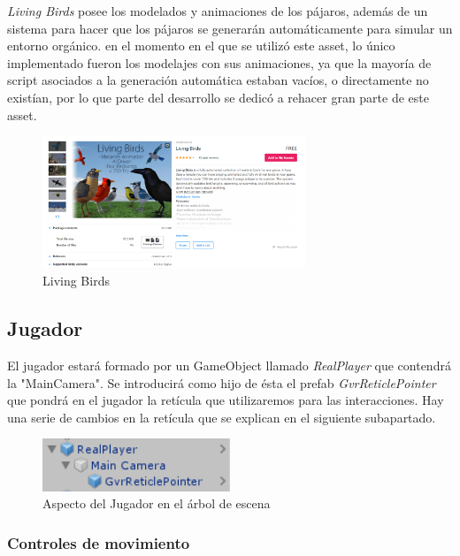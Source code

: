 \quad \textit{Living Birds} posee los modelados y animaciones de los pájaros, además de un sistema para hacer que los pájaros se generarán automáticamente para simular un entorno orgánico. en el momento en el que se utilizó este asset, lo único implementado fueron los modelajes con sus animaciones, ya que la mayoría de script asociados a la generación automática estaban vacíos, o directamente no existían, por lo que parte del desarrollo se dedicó a rehacer gran parte de este asset.

\begin{figure}[htb]
	\centering
	\includegraphics[width=0.7\textwidth]{./imagenes/livingBirds}
	\caption{Living Birds}
\end{figure}
\FloatBarrier

\subsection{Jugador}

\quad El jugador estará formado por un GameObject llamado \textit{RealPlayer} que contendrá la "MainCamera". Se introducirá como hijo de ésta el prefab \textit{GvrReticlePointer} que pondrá en el jugador la retícula que utilizaremos para las interacciones. Hay una serie de cambios en la retícula que se explican en el siguiente subapartado.\\

\begin{figure}[htb]
	\centering
	\includegraphics[width=0.5\textwidth]{./imagenes/player}
	\caption{Aspecto del Jugador en el árbol de escena}
\end{figure}
\FloatBarrier

\subsubsection{Controles de movimiento}


